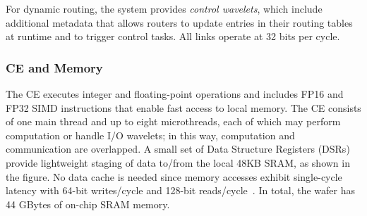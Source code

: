 \documentclass[conference]{IEEEtran}
\begin{document}
                For dynamic routing, the system provides \textit{control wavelets}, which include additional metadata that allows routers to update entries in their routing tables at runtime and to trigger control tasks. %
                All links operate at 32 bits per cycle.

            \subsubsection{CE and Memory}
                The CE executes integer and floating-point operations and includes FP16 and FP32 SIMD instructions
                that enable fast access to local memory. The CE consists of one main thread and up to eight microthreads, each of which may perform computation or handle I/O wavelets; in this way, computation and communication are overlapped.
                A small set of Data Structure Registers (DSRs) provide lightweight staging of data to/from the local 48KB SRAM, as shown in the figure. %
                No data cache is needed since memory accesses exhibit %
                single-cycle latency with 64-bit writes/cycle and 128-bit reads/cycle~\cite{luczynski_reduce}.
                In total, the wafer has 44 GBytes of on-chip SRAM memory.  %

\end{document}
